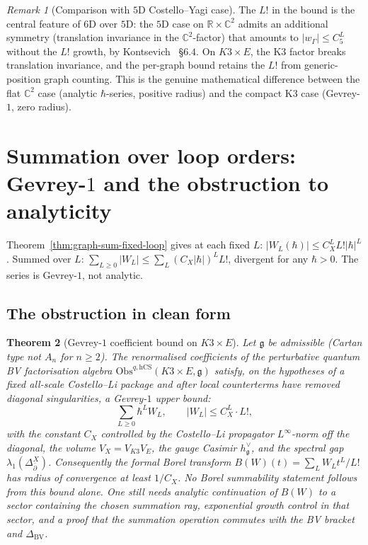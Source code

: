 \documentclass[11pt]{article}
\providecommand{\frakg}{\mathfrak{g}}
\providecommand{\dbar}{\bar{\partial}}
\providecommand{\hCS}{\mathrm{hCS}}
\providecommand{\Obs}{\mathrm{Obs}}
\providecommand{\BV}{\mathrm{BV}}
\providecommand{\C}{\mathbb{C}}
\providecommand{\R}{\mathbb{R}}
\newtheorem{theorem}{Theorem}
\theoremstyle{definition}\newtheorem{definition}[theorem]{Definition}
\theoremstyle{remark}\newtheorem{remark}[theorem]{Remark}\newtheorem{example}[theorem]{Example}
\begin{document}
\begin{remark}[Comparison with $5$D Costello--Yagi case]
The $L!$ in the bound is the central feature of $6$D over $5$D: the
$5$D case on $\R\times\C^2$ admits an additional symmetry
(translation invariance in the $\C^2$-factor) that amounts to
$|w_\Gamma|\leq C_5^L$ without the $L!$ growth, by
Kontsevich~\cite{Kontsevich2003} \S$6.4$. On $K3\times E$, the K3
factor breaks translation invariance, and the per-graph bound retains
the $L!$ from generic-position graph counting. This is the genuine
mathematical difference between the flat $\C^2$ case (analytic
$\hbar$-series, positive radius) and the compact K3 case (Gevrey-$1$,
zero radius).
\end{remark}

\section{Summation over loop orders: Gevrey-$1$ and the obstruction to analyticity}
\label{sec:sum-loop-orders}

Theorem~\ref{thm:graph-sum-fixed-loop} gives at each fixed $L$:
$|W_L(\hbar)|\leq C_X^L L!|\hbar|^L$. Summed over $L$:
$\sum_{L\geq 0}|W_L|\leq \sum_L (C_X|\hbar|)^L L!$, divergent for any
$\hbar > 0$. The series is Gevrey-$1$, not analytic.

\subsection{The obstruction in clean form}

\begin{theorem}[Gevrey-$1$ coefficient bound on $K3\times E$]
\label{thm:gevrey-1-allorders}
Let $\frakg$ be admissible (Cartan type not $A_n$ for $n\geq 2$). The
renormalised coefficients of the perturbative quantum BV factorisation
algebra $\Obs^{q,\hCS}(K3\times E, \frakg)$ satisfy, on the hypotheses
of a fixed all-scale Costello--Li package and after local counterterms
have removed diagonal singularities, a Gevrey-$1$ upper bound:
\begin{equation}
\label{eq:gevrey-1}
\sum_{L\geq 0}\hbar^L W_L,\qquad |W_L|\leq C_X^L\cdot L!,
\end{equation}
with the constant $C_X$ controlled by the Costello--Li propagator
$L^\infty$-norm off the diagonal, the volume $V_X = V_{K3}V_E$, the
gauge Casimir $h^\vee_\frakg$, and the spectral gap
$\lambda_1(\Delta_{\dbar}^X)$. Consequently the formal Borel transform
$B(W)(t)=\sum_L W_Lt^L/L!$ has radius of convergence at least
$1/C_X$. No Borel summability statement follows from this bound alone.
One still needs analytic continuation of $B(W)$ to a sector containing
the chosen summation ray, exponential growth control in that sector,
and a proof that the summation operation commutes with the BV bracket
and $\Delta_{\BV}$.
\end{theorem}
\end{document}
